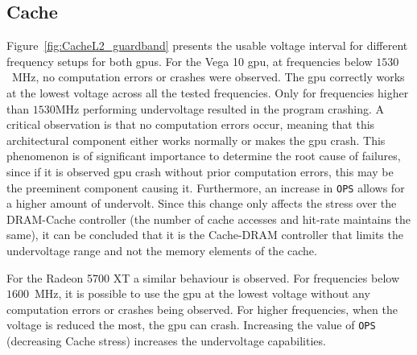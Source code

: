 \subsection{Cache}
\label{sec:cache_guardband}

Figure~\ref{fig:CacheL2_guardband} presents the usable voltage interval for different frequency setups for both \acrshort{gpu}s. 
For the Vega 10 \acrshort{gpu}, at frequencies below $1530$~MHz, no computation errors or crashes were observed. The \acrshort{gpu} correctly works at the lowest voltage across all the tested frequencies. 
Only for frequencies higher than $1530$MHz performing undervoltage resulted in the program crashing. A critical observation is that no computation errors occur, meaning that this architectural component either works normally or makes the \acrshort{gpu} crash. This phenomenon is of significant importance to determine the root cause of failures, since if it is observed \acrshort{gpu} crash without prior computation errors, this may be the preeminent component causing it.
Furthermore, an increase in \texttt{OPS} allows for a higher amount of undervolt. Since this change only affects the stress over the DRAM-Cache controller (the number of cache accesses and hit-rate maintains the same), it can be concluded that it is the Cache-DRAM controller that limits the undervoltage range and not the memory elements of the cache. 

For the Radeon 5700 XT a similar behaviour is observed. For frequencies below $1600$~MHz, it is possible to use the \acrshort{gpu} at the lowest voltage without any computation errors or crashes being observed. For higher frequencies, when the voltage is reduced the most, the \acrshort{gpu} can crash. Increasing the value of \texttt{OPS} (decreasing Cache stress) increases the undervoltage capabilities. 



